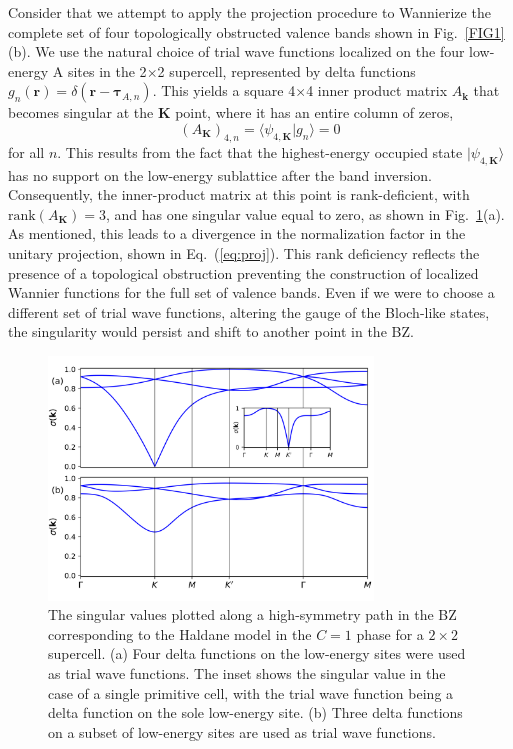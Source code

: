 \documentclass[galley,aps,pra,10pt,amsmath,amssymb,
    superscriptaddress,nofootinbib,longbibliography]{revtex4-2}
\newcounter{comm}
\newcommand{\eq}[1]{Eq.~(\ref{eq:#1})}
\begin{document}
Consider that we attempt to apply the projection procedure to Wannierize the complete set of four topologically obstructed valence bands shown in Fig.~\ref{FIG1}(b). We use the natural choice of trial wave functions localized on the four low-energy A sites in the 2$\times$2 supercell, represented by delta functions $g_n(\mathbf{r}) = \delta(\mathbf{r} - \boldsymbol{\tau}_{A,n})$. This yields a square 4$\times$4 inner product matrix $A_{\mathbf{k}}$ that becomes singular at the $\mathbf{K}$ point, where it has an entire column of zeros, 
\begin{equation}
    (A_{\mathbf{K}})_{4,n} = \langle \psi_{4, \mathbf{K}} | g_{n} \rangle = 0
\end{equation}
for all $n$. This results from the fact that the highest-energy occupied state $|\psi_{4, \mathbf{K}}\rangle$ has no support on the low-energy sublattice after the band inversion. Consequently, the inner-product matrix at this point is rank-deficient, with $\text{rank}(A_{\mathbf{K}})=3$, and has one singular value equal to zero, as shown in Fig.~\ref{FIG2}(a). As mentioned, this leads to a divergence in the normalization factor in the unitary projection, shown in \eq{proj}. This rank deficiency reflects the presence of a topological obstruction preventing the construction of localized Wannier functions for the full set of valence bands. Even if we were to choose a different set of trial wave functions, altering the gauge of the Bloch-like states, the singularity would persist and shift to another point in the BZ.  

\begin{figure}[t!]
\begin{center}
\includegraphics[width=3.4in]{fig2.png}
\end{center}
\vspace{-10mm}
\caption{The singular values plotted along a high-symmetry path in the BZ corresponding to the Haldane model in the $C=1$ phase for a $2\times2$ supercell. (a) Four delta functions on the low-energy sites were used as trial wave functions. The inset shows the singular value in the case of a single primitive cell, with the trial wave function being a delta function on the sole low-energy site. (b) Three delta functions on a subset of low-energy sites are used as trial wave functions. }
\label{FIG2}
\end{figure}
\end{document}
